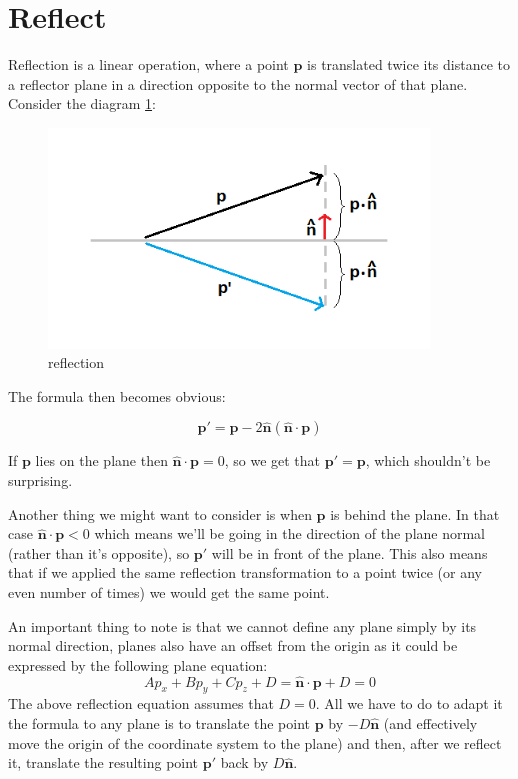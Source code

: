 \documentclass[]{report}   %
\begin{document}
\section{Reflect}

Reflection is a linear operation, where a point \(\mathbf{p}\) is translated twice its distance to a reflector plane in a direction opposite to the normal vector of that plane. Consider the diagram \ref{fig:reflect}:

\begin{figure}[htb]
\centering
\includegraphics[width=0.9\textwidth]{reflection-diagram}
\caption{reflection}
\label{fig:reflect}
\end{figure}

The formula then becomes obvious:
\begin{mdframed}
\[
	\mathbf{p\prime} = 
	\mathbf{p} - 2\mathbf{\hat{n}}(\mathbf{\hat{n}} \cdot \mathbf{p})
\]
\end{mdframed}

If \(\mathbf{p}\) lies on the plane then \(\mathbf{\hat{n}} \cdot \mathbf{p} = 0\), so we get that \(\mathbf{p\prime} = \mathbf{p}\), which shouldn't be surprising. 

Another thing we might want to consider is when \(\mathbf{p}\) is behind the plane. In that case \(\mathbf{\hat{n}} \cdot \mathbf{p} < 0\) which means we'll be going in the direction of the plane normal (rather than it's opposite), so \(\mathbf{p\prime}\) will be in front of the plane. This also means that if we applied the same reflection transformation to a point twice (or any even number of times) we would get the same point.

An important thing to note is that we cannot define any plane simply by its normal direction, planes also have an offset from the origin as it could be expressed by the following plane equation:
\[
	A p_x + B p_y + C p_z + D = \mathbf{\hat{n}} \cdot \mathbf{p} + D = 0
\]
The above reflection equation assumes that \(D=0\). All we have to do to adapt it the formula to any plane is to translate the point \(\mathbf{p}\) by \(-D\mathbf{\hat{n}}\) (and effectively move the origin of the coordinate system to the plane) and then, after we reflect it, translate the resulting point \(\mathbf{p\prime}\) back by \(D\mathbf{\hat{n}}\).
\end{document}
